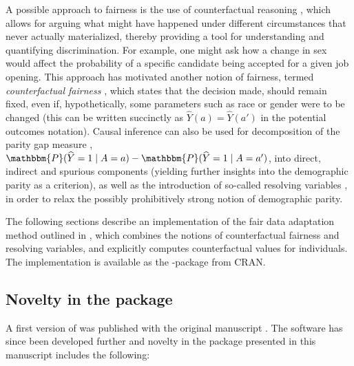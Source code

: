 \documentclass[
  nojss]{jss}
\begin{document}
A possible approach to fairness is the use of counterfactual reasoning
\citep{galles1998axiomatic}, which allows for arguing what might have
happened under different circumstances that never actually materialized,
thereby providing a tool for understanding and quantifying
discrimination. For example, one might ask how a change in sex would
affect the probability of a specific candidate being accepted for a
given job opening. This approach has motivated another notion of
fairness, termed \emph{counterfactual fairness}
\citep{kusner2017counterfactual}, which states that the decision made,
should remain fixed, even if, hypothetically, some parameters such as
race or gender were to be changed (this can be written succinctly as
\(\widehat{Y}(a) = \widehat{Y}(a')\) in the potential outcomes
notation). Causal inference can also be used for decomposition of the
parity gap measure \citep{zhang2018fairness},
\(\mathbbm{P}(\widehat{Y} = 1 \mid A = a) - \mathbbm{P}(\widehat{Y} = 1 \mid A = a')\),
into direct, indirect and spurious components (yielding further insights
into the demographic parity as a criterion), as well as the introduction
of so-called resolving variables \cite{kilbertus2017avoiding}, in order
to relax the possibly prohibitively strong notion of demographic parity.

The following sections describe an implementation of the fair data
adaptation method outlined in \cite{plecko2020fair}, which combines the
notions of counterfactual fairness and resolving variables, and
explicitly computes counterfactual values for individuals. The
implementation is available as the -package 
from CRAN.

\hypertarget{novelty-in-the-package}{%
\subsection{Novelty in the package}\label{novelty-in-the-package}}

A first version of  was published with the original
manuscript \citep{plecko2020fair}. The software has since been developed
further and novelty in the package presented in this manuscript includes
the following:
\end{document}
